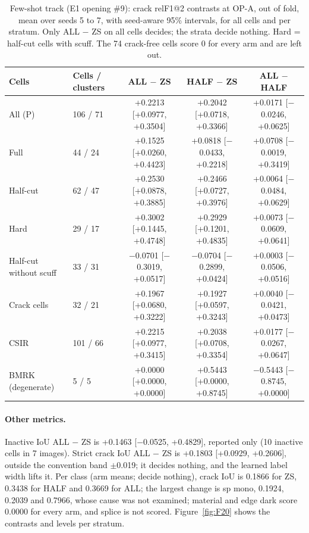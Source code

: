\begin{table}[htbp]
\centering
\scriptsize
\setlength{\tabcolsep}{3pt}
\caption{Few-shot track (E1 opening \#9): crack relF1@2 contrasts at OP-A, out of fold, mean over seeds 5 to 7, with seed-aware
95\% intervals, for all cells and per stratum. Only ALL $-$ ZS on all cells decides; the strata decide nothing. Hard = half-cut
cells with scuff. The 74 crack-free cells score 0 for every arm and are left out.}
\label{tab:t3b-strata}
\begin{tabular}{@{}>{\raggedright\arraybackslash}p{1.8cm}lccc@{}}
\toprule
Cells & Cells / clusters & ALL $-$ ZS & HALF $-$ ZS & ALL $-$ HALF \\
\midrule
All (P) & 106 / 71 & +0.2213 [+0.0977, +0.3504] & +0.2042 [+0.0718, +0.3366] & +0.0171 [$-$0.0246, +0.0625] \\
Full & 44 / 24 & +0.1525 [+0.0260, +0.4423] & +0.0818 [$-$0.0433, +0.2218] & +0.0708 [$-$0.0019, +0.3419] \\
Half-cut & 62 / 47 & +0.2530 [+0.0878, +0.3885] & +0.2466 [+0.0727, +0.3976] & +0.0064 [$-$0.0484, +0.0629] \\
Hard & 29 / 17 & +0.3002 [+0.1445, +0.4748] & +0.2929 [+0.1201, +0.4835] & +0.0073 [$-$0.0609, +0.0641] \\
Half-cut without scuff & 33 / 31 & $-$0.0701 [$-$0.3019, +0.0517] & $-$0.0704 [$-$0.2899, +0.0424] & +0.0003 [$-$0.0506, +0.0516] \\
Crack cells & 32 / 21 & +0.1967 [+0.0680, +0.3222] & +0.1927 [+0.0597, +0.3243] & +0.0040 [$-$0.0421, +0.0473] \\
CSIR & 101 / 66 & +0.2215 [+0.0977, +0.3415] & +0.2038 [+0.0708, +0.3354] & +0.0177 [$-$0.0267, +0.0647] \\
BMRK (degenerate) & 5 / 5 & +0.0000 [+0.0000, +0.0000] & +0.5443 [+0.0000, +0.8745] & $-$0.5443 [$-$0.8745, +0.0000] \\
\bottomrule
\end{tabular}
\end{table}

\paragraph{Other metrics.} Inactive IoU ALL $-$ ZS is +0.1463 [$-$0.0525, +0.4829], reported only (10 inactive cells in 7
images). Strict crack IoU ALL $-$ ZS is +0.1803 [+0.0929, +0.2606], outside the convention band $\pm$0.019; it decides nothing,
and the learned label width lifts it. Per class (arm means; decide nothing), crack IoU is 0.1866 for ZS, 0.3438 for HALF and
0.3669 for ALL; the largest change is sp mono, 0.1924, 0.2039 and 0.7966, whose cause was not examined; material and edge dark
score 0.0000 for every arm, and splice is not scored. Figure~\ref{fig:F20} shows the contrasts and levels per stratum.

